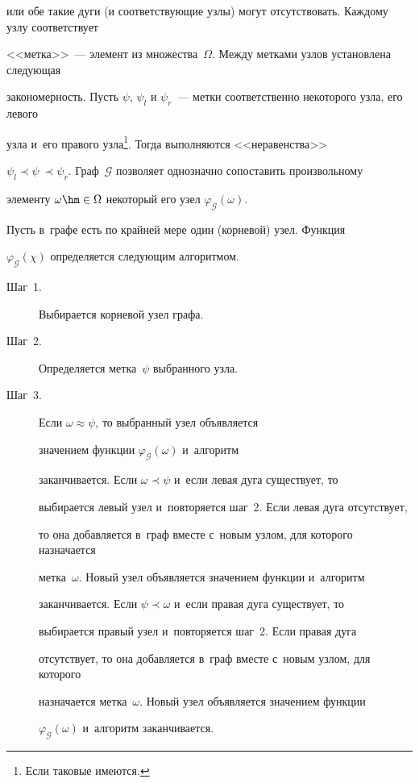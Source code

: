 или обе такие дуги (и соответствующие узлы) могут отсутствовать. Каждому узлу соответствует 


<<метка>>~--- элемент из множества~$\Omega$. Между метками узлов установлена следующая 


закономерность. Пусть $\psi$, $\psi_l$ и $\psi_r$~--- метки соответственно некоторого узла, его левого 


узла и~его правого узла\footnote{Если таковые имеются.}. Тогда выполняются <<неравенства>> 


$\psi_l\prec \psi\ \prec \psi_r$. Граф~$\mathcal{G}$ позволяет однозначно сопоставить произвольному 


элементу $\omega\hm\in \Omega$ некоторый его узел $\varphi_{\mathcal{G}}(\omega)$. 


Пусть в~графе есть по крайней мере один (корневой) узел. Функция 


$\varphi_{\mathcal{G}}(\chi)$ определяется следующим алгоритмом.


  \begin{description}


\item[Шаг~1.] Выбирается корневой узел графа.


  \item[Шаг~2.] Определяется метка~$\psi$ выбранного узла. 


  \item[Шаг~3.] Если $\omega \approx \psi$, то выбранный узел объявляется 


значением функции $\varphi_{\mathcal{G}}(\omega)$ и~алгоритм 


заканчивается. Если $\omega\prec\psi$ и~если левая дуга существует, то 


выбирается левый узел и~повторяется шаг~2. Если левая дуга отсутствует, 


то она добавляется в~граф вместе с~новым узлом, для которого назначается 


метка~$\omega$. Новый узел объявляется значением функции и~алгоритм 


заканчивается. Если $\psi\prec\omega$ и~если правая дуга существует, то 


выбирается правый узел и~повторяется шаг~2. Если правая дуга 


отсутствует, то она добавляется в~граф вместе с~новым узлом, для которого 


назначается метка~$\omega$. Новый узел объявляется значением функции 


$\varphi_{\mathcal{G}}(\omega)$ и~алгоритм заканчивается.


\end{description}


